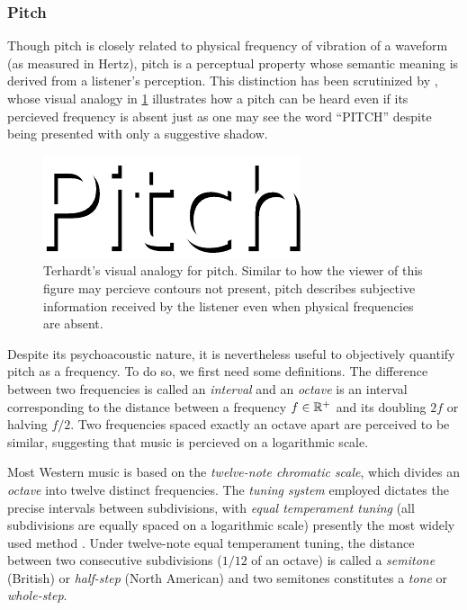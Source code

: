 \subsubsection{Pitch}

Though pitch is closely related to physical frequency of vibration of a
waveform (as measured in Hertz), pitch is a perceptual property whose semantic
meaning is derived from a listener's perception. This distinction has been
scrutinized by \citet{:/content/asa/journal/jasa/55/5/10.1121/1.1914648}, whose
visual analogy in \cref{fig:pitch} illustrates how a pitch can be heard even if
its percieved frequency is absent just as one may see the word ``PITCH''
despite being presented with only a suggestive shadow.

\begin{figure}[htpb]
    \centering
    \includegraphics[width=0.6\linewidth]{pitch.pdf}
    \caption{Terhardt's visual analogy for pitch. Similar to how the viewer of this figure may percieve contours not present, pitch describes subjective information received by the listener even when physical frequencies are absent.}
    \label{fig:pitch}
\end{figure}

Despite its psychoacoustic nature, it is nevertheless useful to objectively
quantify pitch as a frequency. To do so, we first need some definitions. The
difference between two frequencies is called an \emph{interval} and an
\emph{octave} is an interval corresponding to the distance between a frequency
$f \in \mathbb{R}^+$ and its doubling $2f$ or halving $f/2$. Two frequencies spaced
exactly an octave apart are perceived to be similar, suggesting that music is
percieved on a logarithmic scale.

Most Western music is based on the \emph{twelve-note chromatic scale}, which
divides an \emph{octave} into twelve distinct frequencies. The \emph{tuning
system} employed dictates the precise intervals between subdivisions, with
\emph{equal temperament tuning} (all subdivisions are equally spaced on a
logarithmic scale) presently the most widely used
method \citep{denton1997history}. 
Under twelve-note equal temperament tuning, the distance between two
consecutive subdivisions ($1/12$ of an octave) is called a \emph{semitone}
(British) or \emph{half-step} (North American) and two semitones constitutes
a \emph{tone} or \emph{whole-step}.

